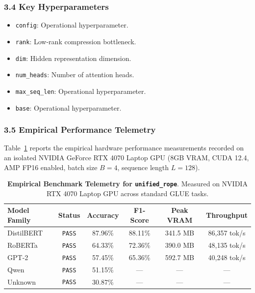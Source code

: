 \subsubsection*{3.4 Key Hyperparameters}
\begin{itemize}
    \item \texttt{config}: Operational hyperparameter.
    \item \texttt{rank}: Low-rank compression bottleneck.
    \item \texttt{dim}: Hidden representation dimension.
    \item \texttt{num\_heads}: Number of attention heads.
    \item \texttt{max\_seq\_len}: Operational hyperparameter.
    \item \texttt{base}: Operational hyperparameter.
\end{itemize}

\subsubsection*{3.5 Empirical Performance Telemetry}
Table~\ref{tab:telemetry_unified_rope} reports the empirical hardware performance measurements recorded on an isolated NVIDIA GeForce RTX 4070 Laptop GPU (8GB VRAM, CUDA 12.4, AMP FP16 enabled, batch size $B=4$, sequence length $L=128$).

\begin{table}[h]
\centering
\small
\caption{\textbf{Empirical Benchmark Telemetry for \texttt{unified\_rope}}. Measured on NVIDIA RTX 4070 Laptop GPU across standard GLUE tasks.}
\label{tab:telemetry_unified_rope}
\begin{tabular*}{\columnwidth}{@{\extracolsep{\fill}}lccccc}
\toprule
\textbf{Model Family} & \textbf{Status} & \textbf{Accuracy} & \textbf{F1-Score} & \textbf{Peak VRAM} & \textbf{Throughput} \\
\midrule
DistilBERT & \texttt{PASS} & 87.96\% & 88.11\% & 341.5 MB & 86,357 tok/s \\
RoBERTa & \texttt{PASS} & 64.33\% & 72.36\% & 390.0 MB & 48,135 tok/s \\
GPT-2 & \texttt{PASS} & 57.45\% & 65.36\% & 592.7 MB & 40,248 tok/s \\
Qwen & \texttt{PASS} & 51.15\% & --- & --- & --- \\
Unknown & \texttt{PASS} & 30.87\% & --- & --- & --- \\
\bottomrule
\end{tabular*}
\end{table}

